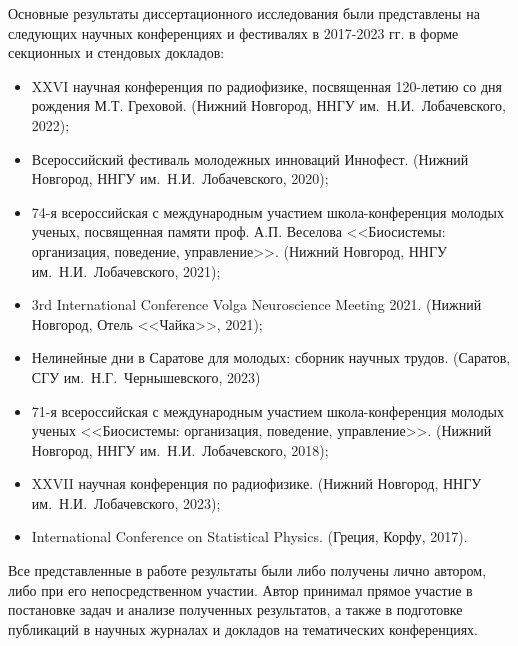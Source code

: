 {\probation}
Основные результаты диссертационного исследования были представлены на следующих научных конференциях и фестивалях в 2017-2023 гг. в форме секционных и стендовых докладов:
\begin{itemize}
    \item XXVI научная конференция по радиофизике, посвященная 120-летию со дня рождения М.Т. Греховой. (Нижний Новгород, ННГУ им.~Н.И.~Лобачевского, 2022);
    \item Всероссийский фестиваль молодежных инноваций Иннофест. (Нижний Новгород, ННГУ им.~Н.И.~Лобачевского, 2020);
    \item 74-я всероссийская с международным участием школа-конференция молодых ученых, посвященная памяти проф. А.П. Веселова <<Биосистемы: организация, поведение, управление>>. (Нижний Новгород, ННГУ им.~Н.И.~Лобачевского, 2021);
    \item 3rd International Conference Volga Neuroscience Meeting 2021. (Нижний Новгород, Отель <<Чайка>>, 2021);
    \item Нелинейные дни в Саратове для молодых: сборник научных трудов. (Саратов, СГУ им.~Н.Г.~Чернышевского, 2023)
    \item 71-я всероссийская с международным участием школа-конференция молодых ученых <<Биосистемы: организация, поведение, управление>>. (Нижний Новгород, ННГУ им.~Н.И.~Лобачевского, 2018);
    \item XXVII научная конференция по радиофизике. (Нижний Новгород, ННГУ им.~Н.И.~Лобачевского, 2023);
    \item International Conference on Statistical Physics. (Греция, Корфу, 2017).
\end{itemize}


{\contribution} Все представленные в работе результаты были либо получены лично автором, либо при его непосредственном участии. Автор принимал прямое участие в постановке задач и анализе полученных результатов, а также в подготовке публикаций в научных журналах и докладов на тематических конференциях.

